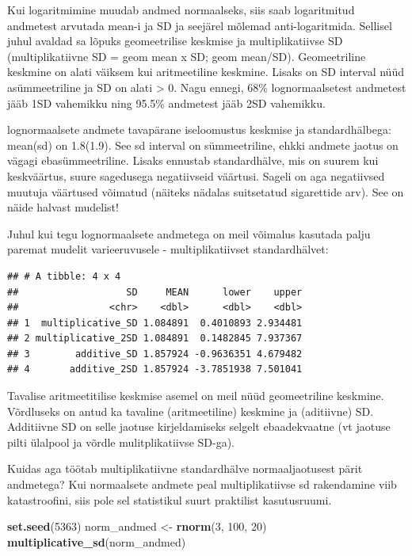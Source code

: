 \documentclass[]{book}
\newenvironment{Shaded}{\begin{snugshade}}{\end{snugshade}}
\newcommand{\KeywordTok}[1]{\textcolor[rgb]{0.13,0.29,0.53}{\textbf{#1}}}
\newcommand{\DecValTok}[1]{\textcolor[rgb]{0.00,0.00,0.81}{#1}}
\newcommand{\StringTok}[1]{\textcolor[rgb]{0.31,0.60,0.02}{#1}}
\newcommand{\NormalTok}[1]{#1}
\begin{document}
Kui logaritmimine muudab andmed normaalseks, siis saab logaritmitud
andmetest arvutada mean-i ja SD ja seejärel mõlemad anti-logaritmida.
Sellisel juhul avaldad sa lõpuks geomeetrilise keskmise ja
multiplikatiivse SD (multiplikatiivne SD = geom mean x SD; geom
mean/SD). Geomeetriline keskmine on alati väiksem kui aritmeetiline
keskmine. Lisaks on SD interval nüüd asümmeetriline ja SD on alati
\textgreater{} 0. Nagu ennegi, 68\% lognormaalsetest andmetest jääb 1SD
vahemikku ning 95.5\% andmetest jääb 2SD vahemikku.

lognormaalsete andmete tavapärane iseloomustus keskmise ja
standardhälbega: mean(sd) on 1.8(1.9). See sd interval on sümmeetriline,
ehkki andmete jaotus on vägagi ebasümmeetriline. Lisaks ennustab
standardhälve, mis on suurem kui keskväärtus, suure sagedusega
negatiivseid väärtusi. Sageli on aga negatiivsed muutuja väärtused
võimatud (näiteks nädalas suitsetatud sigarettide arv). See on näide
halvast mudelist!

Juhul kui tegu lognormaalsete andmetega on meil võimalus kasutada palju
paremat mudelit varieeruvusele - multiplikatiivset standardhälvet:

\begin{verbatim}
## # A tibble: 4 x 4
##                   SD     MEAN      lower    upper
##                <chr>    <dbl>      <dbl>    <dbl>
## 1  multiplicative_SD 1.084891  0.4010893 2.934481
## 2 multiplicative_2SD 1.084891  0.1482845 7.937367
## 3        additive_SD 1.857924 -0.9636351 4.679482
## 4       additive_2SD 1.857924 -3.7851938 7.501041
\end{verbatim}

Tavalise aritmeetitilise keskmise asemel on meil nüüd geomeetriline
keskmine. Võrdluseks on antud ka tavaline (aritmeetiline) keskmine ja
(aditiivne) SD. Additiivne SD on selle jaotuse kirjeldamiseks selgelt
ebaadekvaatne (vt jaotuse pilti ülalpool ja võrdle mulitplikatiivse
SD-ga).

Kuidas aga töötab multiplikatiivne standardhälve normaaljaotusest pärit
andmetega? Kui normaalsete andmete peal multiplikatiivse sd rakendamine
viib katastroofini, siis pole sel statistikul suurt praktilist
kasutusruumi.

\begin{Shaded}
\begin{Highlighting}[]
\KeywordTok{set.seed}\NormalTok{(}\DecValTok{5363}\NormalTok{)}
\NormalTok{norm_andmed <-}\StringTok{ }\KeywordTok{rnorm}\NormalTok{(}\DecValTok{3}\NormalTok{, }\DecValTok{100}\NormalTok{, }\DecValTok{20}\NormalTok{)}
\KeywordTok{multiplicative_sd}\NormalTok{(norm_andmed)}
\end{Highlighting}
\end{Shaded}
\end{document}
